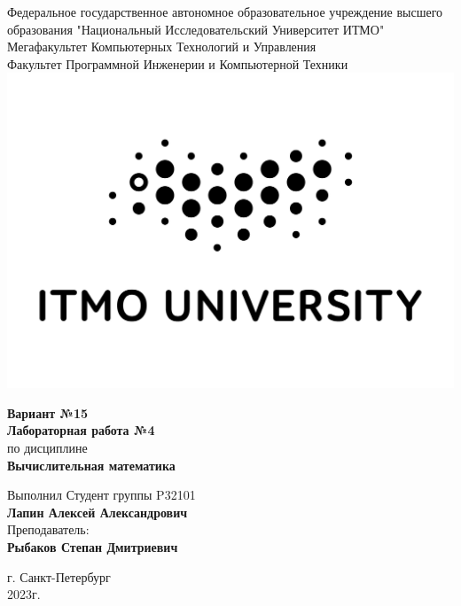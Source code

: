 \documentclass[12pt,one column]{article}
\begin{document}
\begin{center}
    Федеральное государственное автономное образовательное учреждение высшего образования "Национальный Исследовательский Университет ИТМО"\\ 
    Мегафакультет Компьютерных Технологий и Управления\\
    Факультет Программной Инженерии и Компьютерной Техники \\
    \includegraphics[scale=0.2]{itm.jpg} %
\end{center}
\vspace{1cm}

\begin{center}
    \large \textbf{Вариант №15}\\
    \textbf{Лабораторная работа №4}\\
    по дисциплине\\
    \textbf{Вычислительная математика}
\end{center}

\vspace{2cm}

\begin{flushright}
  Выполнил Студент  группы P32101\\
  \textbf{Лапин Алексей Александрович}\\
  Преподаватель: \\
  \textbf{Рыбаков Степан Дмитриевич}\\
\end{flushright}

\vspace{6cm}
\begin{center}
    г. Санкт-Петербург\\
    2023г.
\end{center}
\newpage
\tableofcontents
\newpage
\end{document}
